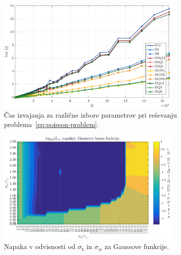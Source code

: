 \documentclass[12pt,a4paper]{article}
\theoremstyle{definition} %
\theoremstyle{plain} %
\numberwithin{equation}{section}
\begin{document}
\begin{figure}[h]
  \centering
  \includegraphics[width=0.8\textwidth]{images/poisson_square_time.pdf}
  \caption{Čas izvajanja za različne izbore parametrov pri reševanju
  problema~\eqref{eq:poisson-problem}.}
  \label{fig:poisson-square-time}
\end{figure}

\begin{figure}[h]
  \centering
  \includegraphics[width=0.8\textwidth]{images/sigma_depedance_error_gau.pdf}
  \caption{Napaka v odvisnosti od $\sigma_b$ in $\sigma_w$ za Gaussove
  funkcije.}
  \label{fig:poisson-square-shapes}
\end{figure}
\end{document}
